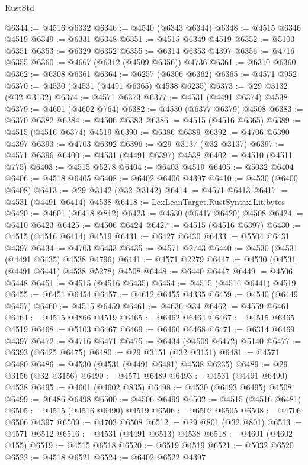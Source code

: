 \begin{lexlean}{RustStd}
\begin{coremodule}
@6344 := @4516 @6332
@6346 := @4540 (@6343 @6344)
@6348 := @4515 @6346 @4519
@6349 := @6331 @6348
@6351 := @4515 @6349 @4519
@6352 := @5103 @6351
@6353 := @6329 @6352
@6355 := @6314 @6353 @4397
@6356 := @4716 @6355
@6360 := @4667 (@6312 (@4509 @6356)) @4736
@6361 := @6310 @6360
@6362 := @6308 @6361
@6364 := @6257 (@6306 @6362)
@6365 := @4571 @952
@6370 := @4530 (@4531 (@4491 @6365) @4538 @6235)
@6373 := @29 @3132 (@32 @3132)
@6374 := @4571 @6373
@6377 := @4531 (@4491 @6374) @4538
@6379 := @4601 (@4602 @764)
@6382 := @4530 (@6377 @6379) @4508
@6383 := @6370 @6382
@6384 := @4506 @6383
@6386 := @4515 (@4516 @6365)
@6389 := @4515 (@4516 @6374) @4519
@6390 := @6386 @6389
@6392 := @4706 @6390 @4397
@6393 := @4703 @6392
@6396 := @29 @3137 (@32 @3137)
@6397 := @4571 @6396
@6400 := @4531 (@4491 @6397) @4538
@6402 := @4510 (@4511 @775)
@6403 := @4515 @5278
@6404 := @6403 @4519
@6405 := @5032 @6404
@6406 := @4518 @6405
@6408 := @6402 @6406 @4397
@6410 := @4530 (@6400 @6408)
@6413 := @29 @3142 (@32 @3142)
@6414 := @4571 @6413
@6417 := @4531 (@4491 @6414) @4538
@6418 := LexLeanTarget.RustSyntax.Lit.bytes
@6420 := @4601 (@6418 @812)
@6423 := @4530 (@6417 @6420) @4508
@6424 := @6410 @6423
@6425 := @4506 @6424
@6427 := @4515 (@4516 @6397)
@6430 := @4515 (@4516 @6414) @4519
@6431 := @6427 @6430
@6433 := @5504 @6431 @4397
@6434 := @4703 @6433
@6435 := @4571 @2743
@6440 := @4530 (@4531 (@4491 @6435) @4538 @4796)
@6441 := @4571 @2279
@6447 := @4530 (@4531 (@4491 @6441) @4538 @5278) @4508
@6448 := @6440 @6447
@6449 := @4506 @6448
@6451 := @4515 (@4516 @6435)
@6454 := @4515 (@4516 @6441) @4519
@6455 := @6451 @6454
@6457 := @4612 @6455 @4335
@6459 := @4540 (@6449 @6457)
@6460 := @4515 @6459
@6461 := @4636 @34
@6462 := @4559 @6461
@6464 := @4515 @4866 @4519
@6465 := @6462 @6464
@6467 := @4515 @6465 @4519
@6468 := @5103 @6467
@6469 := @6460 @6468
@6471 := @6314 @6469 @4397
@6472 := @4716 @6471
@6475 := @6434 (@4509 @6472) @5140
@6477 := @6393 (@6425 @6475)
@6480 := @29 @3151 (@32 @3151)
@6481 := @4571 @6480
@6486 := @4530 (@4531 (@4491 @6481) @4538 @6235)
@6489 := @29 @3156 (@32 @3156)
@6490 := @4571 @6489
@6493 := @4531 (@4491 @6490) @4538
@6495 := @4601 (@4602 @835)
@6498 := @4530 (@6493 @6495) @4508
@6499 := @6486 @6498
@6500 := @4506 @6499
@6502 := @4515 (@4516 @6481)
@6505 := @4515 (@4516 @6490) @4519
@6506 := @6502 @6505
@6508 := @4706 @6506 @4397
@6509 := @4703 @6508
@6512 := @29 @801 (@32 @801)
@6513 := @4571 @6512
@6516 := @4531 (@4491 @6513) @4538
@6518 := @4601 (@4602 @155)
@6519 := @4515 @6518
@6520 := @6519 @4519
@6521 := @5032 @6520
@6522 := @4518 @6521
@6524 := @6402 @6522 @4397

\end{coremodule}
\end{lexlean}
